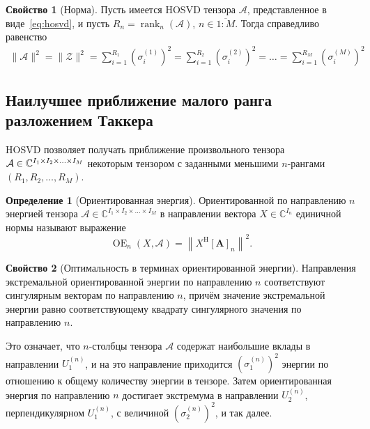 \documentclass[specialist,
  substylefile=spbu_report.rtx,
subf,href,colorlinks=true, 12pt]{disser}
\theoremstyle{plain}
\theoremstyle{definition}
\newtheorem{definition}{Определение}[section]
\newtheorem{property}{Свойство}[section]
\theoremstyle{remark}
\begin{document}
\begin{property}[Норма]
  \label{property:norm}
  Пусть имеется HOSVD тензора $\mathcal{A}$, представленное в
  виде~\eqref{eq:hosvd}, и пусть $R_n=\operatorname{rank}_n(\mathcal{A})$,
  $n\in \overline{1:M}$.
  Тогда справедливо равенство
  \begin{align*}
    \|\mathcal{A}\|^2=\|\mathcal{Z}\|^2 =\sum_{i=1}^{R_1}\left(
    \sigma_i^{(1)} \right)^2=\sum_{i=1}^{R_2}\left( \sigma_i^{(2)} \right)^2
    =\ldots =\sum_{i=1}^{R_M}\left( \sigma_i^{(M)} \right)^2
  \end{align*}
\end{property}

\subsection{Наилучшее приближение малого ранга разложением
Таккера}\label{subsec:tensor-approx}
HOSVD позволяет получать приближение произвольного тензора
$\mathcal{A}\in \mathbb{C}^{I_1 \times I_2 \times \ldots \times I_M}$ некоторым
тензором с заданными меньшими $n$-рангами
$(R_1, R_2, \ldots, R_M)$.

\begin{definition}[Ориентированная энергия]
  Ориентированной по направлению $n$ энергией тензора $\mathcal{A}\in
  \mathbb{C}^{I_1\times I_2\times \ldots \times I_M}$ в направлении
  вектора $X\in \mathbb{C}^{I_n}$ единичной нормы называют выражение
  \[
    \operatorname{OE}_n(X, \mathcal{A}) =
    \left\|X^{\mathrm{H}}[\mathbf{A}]_{n}\right\|^2.
  \]
\end{definition}
\begin{property}[Оптимальность в терминах ориентированной энергии]
  \label{property:oriented-energy}
  Направления экстремальной ориентированной энергии по направлению
  $n$ соответствуют сингулярным векторам по направлению $n$,
  причём значение экстремальной энергии равно соответствующему
  квадрату сингулярного значения по направлению $n$.
\end{property}
Это означает, что $n$-столбцы тензора $\mathcal{A}$ содержат
наибольшие вклады в
направлении $U^{(n)}_1$, и
на это направление приходится $\left(\sigma^{(n)}_1\right)^2$ энергии
по отношению к общему количеству энергии в тензоре.
Затем ориентированная энергия по направлению $n$ достигает экстремума
в направлении $U^{(n)}_2$,
перпендикулярном $U^{(n)}_1$, с величиной
$\left(\sigma^{(n)}_2\right)^2$, и так далее.
\end{document}
